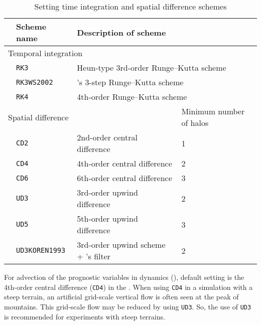 \begin{table}[bth]
\begin{center}
  \caption{Setting time integration and spatial difference schemes}
  \label{tab:nml_atm_dyn}
  \begin{tabularx}{150mm}{lllX} \hline
    \rowcolor[gray]{0.9} & \multicolumn{1}{l}{Scheme name} & \multicolumn{1}{l}{Description of scheme} & \\ \hline
    \multicolumn{3}{l}{Temporal integration} &  \\ \hline
    & \multicolumn{1}{l}{\verb|RK3|} & \multicolumn{2}{l}{Heun-type 3rd-order Runge--Kutta scheme} \\
    & \multicolumn{1}{l}{\verb|RK3WS2002|} & \multicolumn{2}{l}{\citet{Wicker_2002}'s 3-step Runge--Kutta scheme} \\
    & \multicolumn{1}{l}{\verb|RK4|} & \multicolumn{2}{l}{4th-order Runge--Kutta scheme} \\
    \hline
    \multicolumn{3}{l}{Spatial difference} & Minimum number of halos\\ \hline
    & \multicolumn{1}{l}{\verb|CD2|} & \multicolumn{1}{l}{2nd-order central difference} & \multicolumn{1}{l}{1}\\
    & \multicolumn{1}{l}{\verb|CD4|} & \multicolumn{1}{l}{4th-order central difference} & \multicolumn{1}{l}{2}\\
    & \multicolumn{1}{l}{\verb|CD6|} & \multicolumn{1}{l}{6th-order central difference} & \multicolumn{1}{l}{3}\\
    & \multicolumn{1}{l}{\verb|UD3|} & \multicolumn{1}{l}{3rd-order upwind difference} & \multicolumn{1}{l}{2}\\
    & \multicolumn{1}{l}{\verb|UD5|} & \multicolumn{1}{l}{5th-order upwind difference} & \multicolumn{1}{l}{3}\\
    & \multicolumn{1}{l}{\verb|UD3KOREN1993|} & \multicolumn{1}{l}{3rd-order upwind scheme + \citet{Koren_1993}'s filter} & \multicolumn{1}{l}{2}\\
\hline
  \end{tabularx}
\end{center}
\end{table}

For advection of the prognostic variables in dynamics (),
default setting is the 4th-order central difference (\verb|CD4|) in the \scalerm.
When using \verb|CD4| in a simulation with a steep terrain,
an artificial grid-scale vertical flow is often seen at the peak of mountains.
This grid-scale flow may be reduced by using \verb|UD3|.
So, the use of \verb|UD3| is recommended for experiments with steep terrains.


